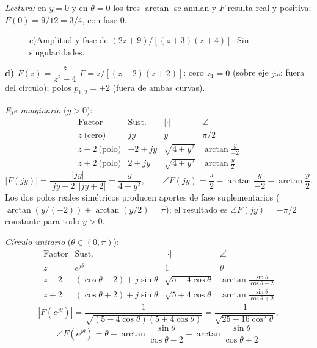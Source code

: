 \documentclass[10pt,a4paper]{article}
\begin{document}
\noindent\textit{Lectura:} en $y=0$ y en $\theta=0$ los tres $\arctan$ se anulan y $F$ resulta real y positiva: $F(0)=9/12=3/4$, con fase $0$.

\begin{figure}[H]\centering
	
	\caption{c)\enspace Amplitud y fase de $(2z+9)/[(z+3)(z+4)]$. Sin singularidades.}
	\label{fig:resp16c}
\end{figure}

\bigskip

\noindent\textbf{d) $F(z)=\dfrac{z}{z^2-4}$}\;\textemdash\; $F=z/[(z-2)(z+2)]$: cero $z_1=0$ (sobre eje $j\omega$; fuera del círculo); polos $p_{1,2}=\pm 2$ (fuera de ambas curvas).

\medskip
\noindent\textit{Eje imaginario} ($y>0$):
\[
	\renewcommand{\arraystretch}{1.3}
	\begin{array}{l|c|c|c}
	\text{Factor} & \text{Sust.} & |\cdot| & \angle \\\hline
	z\ \text{(cero)}    & jy    & y            & \pi/2 \\
	z-2\ \text{(polo)}  & -2+jy & \sqrt{4+y^2} & \arctan\tfrac{y}{-2} \\
	z+2\ \text{(polo)}  & 2+jy  & \sqrt{4+y^2} & \arctan\tfrac{y}{2}
	\end{array}
\]
\[
	|F(jy)| = \frac{|jy|}{|jy-2|\,|jy+2|} = \frac{y}{4+y^2},\qquad
	\angle F(jy) = \frac{\pi}{2} - \arctan\!\frac{y}{-2} - \arctan\!\frac{y}{2}.
\]
Los dos polos reales simétricos producen aportes de fase suplementarios ($\arctan(y/(-2))+\arctan(y/2)=\pi$); el resultado es $\angle F(jy)=-\pi/2$ constante para todo $y>0$.

\medskip
\noindent\textit{Círculo unitario} ($\theta\in(0,\pi)$):
\[
	\renewcommand{\arraystretch}{1.3}
	\begin{array}{l|c|c|c}
	\text{Factor} & \text{Sust.} & |\cdot| & \angle \\\hline
	z   & e^{j\theta}                & 1                    & \theta \\
	z-2 & (\cos\theta-2)+j\sin\theta & \sqrt{5-4\cos\theta} & \arctan\tfrac{\sin\theta}{\cos\theta-2} \\
	z+2 & (\cos\theta+2)+j\sin\theta & \sqrt{5+4\cos\theta} & \arctan\tfrac{\sin\theta}{\cos\theta+2}
	\end{array}
\]
\[
	|F(e^{j\theta})| = \frac{1}{\sqrt{(5-4\cos\theta)(5+4\cos\theta)}} = \frac{1}{\sqrt{25-16\cos^2\theta}},
\]
\[
	\angle F(e^{j\theta}) = \theta - \arctan\!\frac{\sin\theta}{\cos\theta-2} - \arctan\!\frac{\sin\theta}{\cos\theta+2}.
\]
\end{document}
